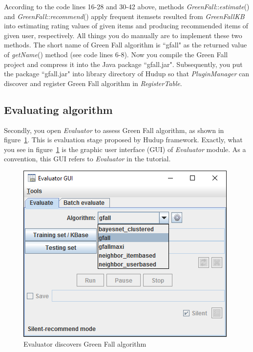 \documentclass[a4paper,twoside]{article}
\begin{document}
According to the code lines 16-28 and 30-42 above, methods \textit{GreenFall}::\textit{estimate}() and \textit{GreenFall}::\textit{recommend}() apply frequent itemsets resulted from \textit{GreenFallKB} into estimating rating values of given items and producing recommended items of given user, respectively. All things you do manually are to implement these two methods. The short name of Green Fall algorithm is ``gfall" as the returned value of \textit{getName}() method (see code lines 6-8). Now you compile the Green Fall project and compress it into the Java package ``gfall.jar". Subsequently, you put the package ``gfall.jar" into library directory of Hudup so that \textit{PluginManager} can discover and register Green Fall algorithm in \textit{RegisterTable}.

\subsection{Evaluating algorithm}
\label{subsec:tutorial-evaluating}
Secondly, you open \textit{Evaluator} to assess Green Fall algorithm, as shown in figure~\ref{figure:evaluator-discovery}. This is evaluation stage proposed by Hudup framework. Exactly, what you see in figure~\ref{figure:evaluator-discovery} is the graphic user interface (GUI) of \textit{Evaluator} module. As a convention, this GUI refers to \textit{Evaluator} in the tutorial.
\begin{figure}
\centering
\includegraphics{EvaluatorDiscovery.png}
\caption{Evaluator discovers Green Fall algorithm}
\label{figure:evaluator-discovery}
\end{figure}
\end{document}
